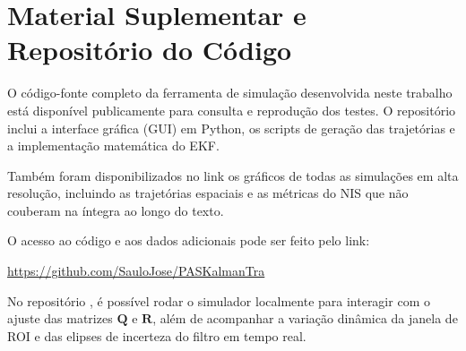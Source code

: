 \documentclass[journal]{IEEEtran}
\begin{document}









\appendices

\section{Material Suplementar e Repositório do Código}
\label{apendice:material_suplementar}

O código-fonte completo da ferramenta de simulação desenvolvida neste trabalho está disponível publicamente para consulta e reprodução dos testes. O repositório inclui a interface gráfica (GUI) em Python, os scripts de geração das trajetórias e a implementação matemática do EKF. 

Também foram disponibilizados no link os gráficos de todas as simulações em alta resolução, incluindo as trajetórias espaciais e as métricas do NIS que não couberam na íntegra ao longo do texto.

O acesso ao código e aos dados adicionais pode ser feito pelo link:

\begin{center}
    \url{https://github.com/SauloJose/PASKalmanTra}
\end{center}

No repositório \cite{silva2026ferramenta}, é possível rodar o simulador localmente para interagir com o ajuste das matrizes $\mathbf{Q}$ e $\mathbf{R}$, além de acompanhar a variação dinâmica da janela de ROI e das elipses de incerteza do filtro em tempo real.


\end{document}
